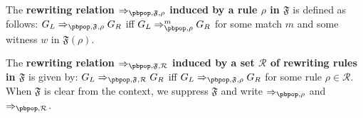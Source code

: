 \begin{definition}
  The \textbf{rewriting relation $\Rightarrow_{\text{\pbpop},\mathfrak{F},\rho} $ induced by a rule $\rho$ in $\mathfrak{F}$} is defined as follows: $G_L \Rightarrow_{\text{\pbpop},\mathfrak{F},\rho} G_R$ iff $G_L \Rightarrow^m_{\text{\pbpop},\rho} G_R$ for some match \(m\) and some witness \(w\) in \(\mathfrak{F}(\rho)\).

    The \textbf{rewriting relation $\Rightarrow_{\text{\pbpop},\mathfrak{F},\mathcal{R}}$ induced by a set $\mathcal{R}$ of \pbpop rewriting rules in $\mathfrak{F}$} is given by: $G_L \Rightarrow_{\text{\pbpop},\mathfrak{F},\mathcal{R}} G_R$ iff $G_L \Rightarrow_{\text{\pbpop},\mathfrak{F},\rho} G_R$ for some rule $\rho \in \mathcal{R}$. When $\mathfrak{F}$ is clear from the context, we suppress $\mathfrak{F}$ and write $\Rightarrow_{\text{\pbpop},\rho}$ and $\Rightarrow_{\text{\pbpop},\mathcal{R}}$.
\end{definition}


